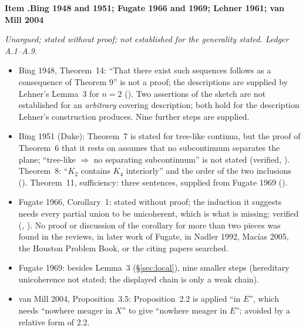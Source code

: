 \documentclass[11pt]{article}
\newcounter{defect}
\newenvironment{defect}[4]{%
  \par\addvspace{10pt}\refstepcounter{defect}%
  \noindent\textbf{Item \thedefect.\enspace #1}\par\nopagebreak
  \noindent\textit{#2}\par\nopagebreak\smallskip}{\par\addvspace{6pt}}
\begin{document}
\begin{defect}{Bing 1948 and 1951; Fugate 1966 and 1969; Lehner 1961; van Mill 2004}{Unargued; stated
without proof; not established for the generality stated. Ledger A.1--A.9.}{0}{0}\label{it:un-bing}
\begin{itemize}
\item Bing 1948, Theorem~14: ``That there exist such sequences follows as a consequence of Theorem
  9'' is not a proof; the descriptions are supplied by Lehner's Lemma~3 for $n=2$
  (). Two assertions of the sketch are not established for an
  \emph{arbitrary} covering description; both hold for the description Lehner's construction
  produces. Nine further steps are supplied.
\item Bing 1951 (Duke): Theorem~7 is stated for tree-like continua, but the proof of Theorem~6 that
  it rests on assumes that no subcontinuum separates the plane; ``tree-like $\Rightarrow$ no
  separating subcontinuum'' is not stated (verified, ). Theorem~8:
  ``$K_2$ contains $K_4$ interiorly'' and the order of the two inclusions ().
  Theorem~11, sufficiency: three sentences, supplied from Fugate 1969 ().
\item Fugate 1966, Corollary~1: stated without proof; the induction it suggests needs every partial
  union to be unicoherent, which is what is missing; verified (,
  ). No proof or discussion of the corollary for more than two pieces was found
  in the reviews, in later work of Fugate, in Nadler 1992, Macías 2005, the Houston Problem Book,
  or the citing papers searched.
\item Fugate 1969: besides Lemma~3 (\S\ref{sec:local}), nine smaller steps (hereditary unicoherence
  not stated; the displayed chain is only a weak chain).
\item van Mill 2004, Proposition~3.5: Proposition~2.2 is applied ``in $E$'', which needs ``nowhere
  meager in $X$'' to give ``nowhere meager in $E$''; avoided by a relative form of 2.2.
\end{itemize}
\end{defect}
\end{document}
